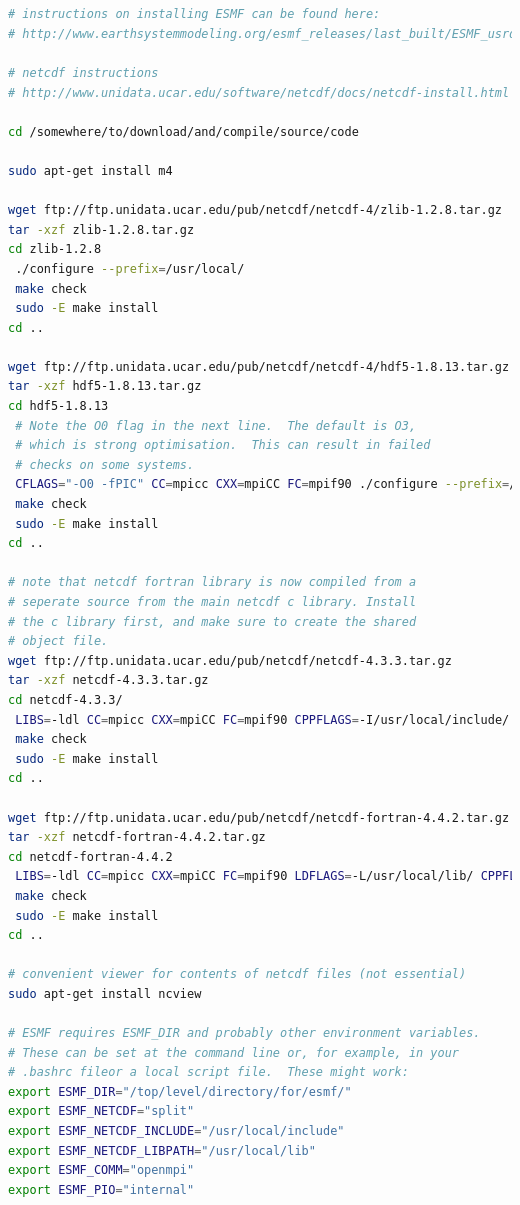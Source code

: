 \documentclass[12pt]{article}
\begin{document}
\begin{lstlisting}[language=bash]


# instructions on installing ESMF can be found here:
# http://www.earthsystemmodeling.org/esmf_releases/last_built/ESMF_usrdoc/node9.html

# netcdf instructions
# http://www.unidata.ucar.edu/software/netcdf/docs/netcdf-install.html

cd /somewhere/to/download/and/compile/source/code

sudo apt-get install m4

wget ftp://ftp.unidata.ucar.edu/pub/netcdf/netcdf-4/zlib-1.2.8.tar.gz
tar -xzf zlib-1.2.8.tar.gz 
cd zlib-1.2.8
 ./configure --prefix=/usr/local/
 make check
 sudo -E make install
cd ..

wget ftp://ftp.unidata.ucar.edu/pub/netcdf/netcdf-4/hdf5-1.8.13.tar.gz	
tar -xzf hdf5-1.8.13.tar.gz 
cd hdf5-1.8.13
 # Note the O0 flag in the next line.  The default is O3, 
 # which is strong optimisation.  This can result in failed 
 # checks on some systems.
 CFLAGS="-O0 -fPIC" CC=mpicc CXX=mpiCC FC=mpif90 ./configure --prefix=/usr/local/ --with-zlib=/usr/local  --enable-fortran --enable-parallel --enable-shared
 make check
 sudo -E make install
cd ..

# note that netcdf fortran library is now compiled from a 
# seperate source from the main netcdf c library. Install 
# the c library first, and make sure to create the shared
# object file. 
wget ftp://ftp.unidata.ucar.edu/pub/netcdf/netcdf-4.3.3.tar.gz
tar -xzf netcdf-4.3.3.tar.gz 
cd netcdf-4.3.3/
 LIBS=-ldl CC=mpicc CXX=mpiCC FC=mpif90 CPPFLAGS=-I/usr/local/include/ LDFLAGS=-L/usr/local/lib/  ./configure --prefix=/usr/local --enable-parallel 
 make check
 sudo -E make install
cd ..

wget ftp://ftp.unidata.ucar.edu/pub/netcdf/netcdf-fortran-4.4.2.tar.gz
tar -xzf netcdf-fortran-4.4.2.tar.gz 
cd netcdf-fortran-4.4.2
 LIBS=-ldl CC=mpicc CXX=mpiCC FC=mpif90 LDFLAGS=-L/usr/local/lib/ CPPFLAGS="-I/usr/local/include -DUSE_NETCDF4"  ./configure --prefix=/usr/local
 make check
 sudo -E make install
cd ..

# convenient viewer for contents of netcdf files (not essential)
sudo apt-get install ncview

# ESMF requires ESMF_DIR and probably other environment variables.  
# These can be set at the command line or, for example, in your 
# .bashrc fileor a local script file.  These might work:
export ESMF_DIR="/top/level/directory/for/esmf/"
export ESMF_NETCDF="split"
export ESMF_NETCDF_INCLUDE="/usr/local/include"
export ESMF_NETCDF_LIBPATH="/usr/local/lib"
export ESMF_COMM="openmpi"
export ESMF_PIO="internal"
                                                                                                              

\end{lstlisting}
\end{document}
